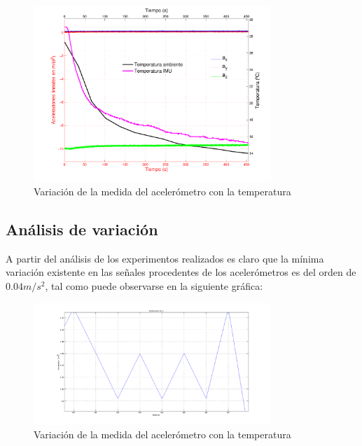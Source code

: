 \documentclass[main]{subfiles}
\begin{document}
\begin{figure}[H]
  \begin{center}
    \includegraphics[width=0.8\textwidth]{./pics_acc/bajada.pdf}
  \end{center}
  \vspace{-20pt}
  \caption{Variación de la medida del acelerómetro con la temperatura }
  \label{fig:bajada}
\end{figure}

\subsection{Análisis de variación}
A partir del análisis de los experimentos realizados es claro que la mínima variación existente en las señales procedentes de los acelerómetros es del orden de $0.04 m/s^2$, tal como puede observarse en la siguiente gráfica:

\begin{figure}[H]
  \begin{center}
    \includegraphics[width=0.8\textwidth]{./pics_acc/variacion.png}
  \end{center}
  \vspace{-20pt}
  \caption{Variación de la medida del acelerómetro con la temperatura }
  \label{fig:variacion}
\end{figure}
\end{document}
